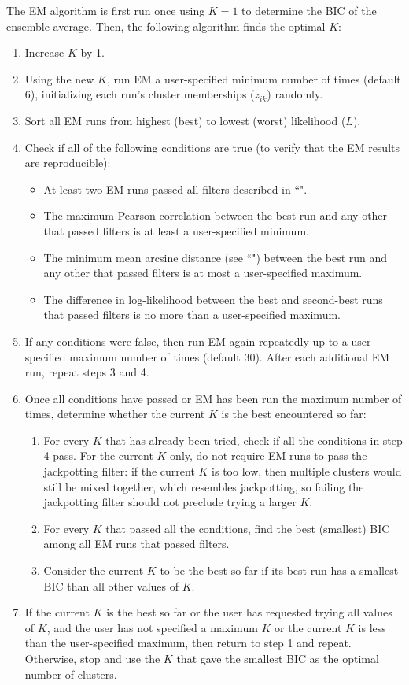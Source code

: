 \documentclass[11pt]{article}
\begin{document}
The EM algorithm is first run once using $K = 1$ to determine the BIC of the ensemble average.
Then, the following algorithm finds the optimal $K$:
\begin{enumerate}
    \item Increase $K$ by 1.
    \item Using the new $K$, run EM a user-specified minimum number of times (default 6), initializing each run's cluster memberships ($z_{ik}$) randomly.
    \item Sort all EM runs from highest (best) to lowest (worst) likelihood ($L$).
    \item Check if all of the following conditions are true (to verify that the EM results are reproducible):
    \begin{itemize}
        \item At least two EM runs passed all filters described in ``".
        \item The maximum Pearson correlation between the best run and any other that passed filters is at least a user-specified minimum.
        \item The minimum mean arcsine distance (see ``") between the best run and any other that passed filters is at most a user-specified maximum.
        \item The difference in log-likelihood between the best and second-best runs that passed filters is no more than a user-specified maximum.
    \end{itemize}
    \item If any conditions were false, then run EM again repeatedly up to a user-specified maximum number of times (default 30). After each additional EM run, repeat steps 3 and 4.
    \item Once all conditions have passed or EM has been run the maximum number of times, determine whether the current $K$ is the best encountered so far:
    \begin{enumerate}
        \item For every $K$ that has already been tried, check if all the conditions in step 4 pass. For the current $K$ only, do not require EM runs to pass the jackpotting filter: if the current $K$ is too low, then multiple clusters would still be mixed together, which resembles jackpotting, so failing the jackpotting filter should not preclude trying a larger $K$.
        \item For every $K$ that passed all the conditions, find the best (smallest) BIC among all EM runs that passed filters.
        \item Consider the current $K$ to be the best so far if its best run has a smallest BIC than all other values of $K$.
    \end{enumerate}
    \item If the current $K$ is the best so far or the user has requested trying all values of $K$, and the user has not specified a maximum $K$ or the current $K$ is less than the user-specified maximum, then return to step 1 and repeat. Otherwise, stop and use the $K$ that gave the smallest BIC as the optimal number of clusters.
\end{enumerate}
\end{document}
